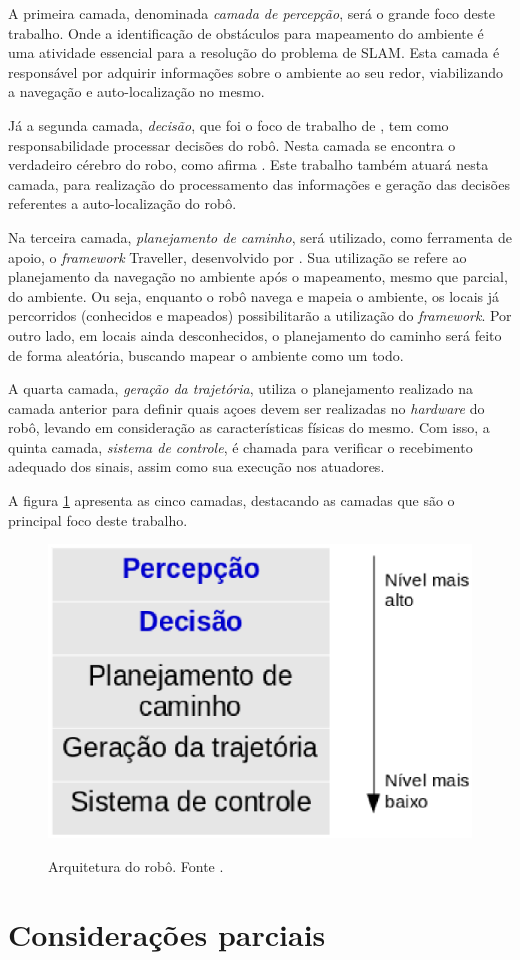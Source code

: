 		A primeira camada, denominada \textit{camada de percepção}, será o grande foco deste trabalho. Onde a identificação de obstáculos para mapeamento do ambiente é uma atividade essencial para a resolução do problema de SLAM. Esta camada é responsável por adquirir informações sobre o ambiente ao seu redor, viabilizando a navegação e auto-localização no mesmo.

		Já a segunda camada, \textit{decisão}, que foi o foco de trabalho de \cite{tccCarol}, tem como responsabilidade processar decisões do robô. Nesta camada se encontra o verdadeiro cérebro do robo, como afirma \cite{vieira}. Este trabalho também atuará nesta camada, para realização do processamento das informações e geração das decisões referentes a auto-localização do robô.

		Na terceira camada, \textit{planejamento de caminho}, será utilizado, como ferramenta de apoio, o \textit{framework} Traveller, desenvolvido por \cite{tccRodrigo}. Sua utilização se refere ao planejamento da navegação no ambiente após o mapeamento, mesmo que parcial, do ambiente. Ou seja, enquanto o robô navega e mapeia o ambiente, os locais já percorridos (conhecidos e mapeados) possibilitarão a utilização do \textit{framework}. Por outro lado, em locais ainda desconhecidos, o planejamento do caminho será feito de forma aleatória, buscando mapear o ambiente como um todo.

		A quarta camada, \textit{geração da trajetória}, utiliza o planejamento realizado na camada anterior para definir quais açoes devem ser realizadas no \textit{hardware} do robô, levando em consideração as características físicas do mesmo. Com isso, a quinta camada, \textit{sistema de controle}, é chamada para verificar o recebimento adequado dos sinais, assim como sua execução nos atuadores. 

		A figura \ref{img:camadas} apresenta as cinco camadas, destacando as camadas que são o principal foco deste trabalho.

		\begin{figure}[H]
			\centering
			\caption{Arquitetura do robô. Fonte \cite{vieira}.}
			\includegraphics[scale=0.5]{figuras/camadas.eps}
			\label{img:camadas}
		\end{figure}


	


\section{Considerações parciais} %
\label{sec:considerações_parciais}

